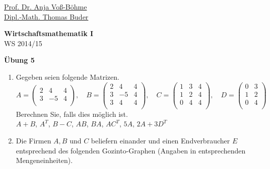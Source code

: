 \documentclass[12pt,a4paper]{scrreprt}
\begin{document}
 
\begin{flushleft}
\href{mailto:anja.voss-boehme@htw-dresden.de}{Prof. Dr. Anja Voß-Böhme} \\
\href{mailto:buder@htw-dresden.de}{Dipl.-Math. Thomas Buder}
\end{flushleft}

\begin{center}
\large{\textbf{ Wirtschaftsmathematik I}} \\
WS 2014/15 \end{center}

\begin{center}\large{\textbf{ Übung 5 }} \end{center}

\bigskip
\begin{enumerate}
\item Gegeben seien folgende Matrizen. 
\[A=\begin{pmatrix}
2 & 4 & 4\\
3 & -5 & 4\\

\end{pmatrix}, \quad B=\begin{pmatrix}
2 & 4 & 4\\
3 & -5 & 4\\
3 & 4 & 4\\
\end{pmatrix}, \quad C=\begin{pmatrix}
1 & 3 & 4\\
1 & 2 & 4\\
0 & 4 & 4\\
\end{pmatrix},\quad D=\begin{pmatrix}
0 & 3 \\
1 & 2 \\
0 & 4 \\
\end{pmatrix}\]
Berechnen Sie, falls dies möglich ist. \\

 $A + B$, \quad $A^T$, \quad $B - C$, \quad $AB$, \quad $BA$, \quad $AC^T$, \quad $5A$, \quad $2A+3D^T$



\item Die Firmen $A,B$ und $C$ beliefern einander und einen Endverbraucher $E$ entsprechend des folgenden
Gozinto-Graphen (Angaben in entsprechenden Mengeneinheiten). 


\end{enumerate}
\end{document}
